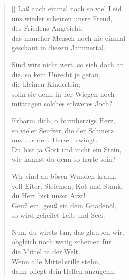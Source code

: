 \begin{multicols}{2}
\begin{verse}[\versewidth]
 Laß auch einmal nach so viel Leid\\
uns wieder scheinen unsre Freud,\\
des Friedens Angesicht,\\
das mancher Mensch noch nie einmal\\
geschaut in diesem Jammertal.

 Sind wirs nicht wert, so sieh doch an\\
die, so kein Unrecht je getan,\\
die kleinen Kinderlein;\\
solln sie denn in der Wiegen noch\\
mittragen solches schweres Joch?

 Erbarm dich, o barmherzigs Herz,\\
so vieler Seufzer, die der Schmerz\\
uns aus dem Herzen zwingt.\\
Du bist ja Gott und nicht ein Stein,\\
wie kannst du denn so harte sein?

 Wir sind an bösen Wunden krank,\\
voll Eiter, Striemen, Kot und Stank,\\
du Herr bist unser Arzt!\\
Geuß ein, geuß ein dein Gnadenöl,\\
so wird geheilet Leib und Seel.

 Nun, du wirsts tun, das glauben wir,\\
obgleich noch wenig scheinen für\\
die Mittel in der Welt.\\
Wenn alle Mittel stille stehn,\\
dann pflegt dein Helfen anzugehn.

\end{verse}
\end{multicols}

